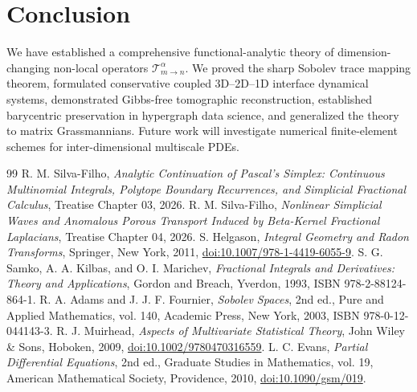 \documentclass[11pt,a4paper]{article}
\theoremstyle{plain}
\theoremstyle{definition}
\theoremstyle{remark}
\numberwithin{equation}{section}
\begin{document}
\section{Conclusion}

We have established a comprehensive functional-analytic theory of dimension-changing non-local operators $\mathcal{T}_{m \to n}^\alpha$. We proved the sharp Sobolev trace mapping theorem, formulated conservative coupled 3D--2D--1D interface dynamical systems, demonstrated Gibbs-free tomographic reconstruction, established barycentric preservation in hypergraph data science, and generalized the theory to matrix Grassmannians. Future work will investigate numerical finite-element schemes for inter-dimensional multiscale PDEs.

\begin{thebibliography}{99}
 R. M. Silva-Filho, \emph{Analytic Continuation of Pascal's Simplex: Continuous Multinomial Integrals, Polytope Boundary Recurrences, and Simplicial Fractional Calculus}, Treatise Chapter 03, 2026.
 R. M. Silva-Filho, \emph{Nonlinear Simplicial Waves and Anomalous Porous Transport Induced by Beta-Kernel Fractional Laplacians}, Treatise Chapter 04, 2026.
 S. Helgason, \emph{Integral Geometry and Radon Transforms}, Springer, New York, 2011, \href{https://doi.org/10.1007/978-1-4419-6055-9}{doi:10.1007/978-1-4419-6055-9}.
 S. G. Samko, A. A. Kilbas, and O. I. Marichev, \emph{Fractional Integrals and Derivatives: Theory and Applications}, Gordon and Breach, Yverdon, 1993, ISBN 978-2-88124-864-1.
 R. A. Adams and J. J. F. Fournier, \emph{Sobolev Spaces}, 2nd ed., Pure and Applied Mathematics, vol. 140, Academic Press, New York, 2003, ISBN 978-0-12-044143-3.
 R. J. Muirhead, \emph{Aspects of Multivariate Statistical Theory}, John Wiley \& Sons, Hoboken, 2009, \href{https://doi.org/10.1002/9780470316559}{doi:10.1002/9780470316559}.
 L. C. Evans, \emph{Partial Differential Equations}, 2nd ed., Graduate Studies in Mathematics, vol. 19, American Mathematical Society, Providence, 2010, \href{https://doi.org/10.1090/gsm/019}{doi:10.1090/gsm/019}.
\end{thebibliography}
\end{document}
